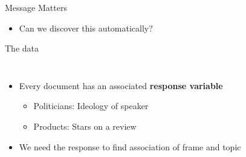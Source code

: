 \documentclass[xcolor=dvipsnames]{beamer}
\begin{document}
{\begin{frame}{Message Matters}
\begin{itemize}
\begin{columns}
\end{columns}
\pause
  \item Can we discover this automatically?
\end{itemize}




\end{frame}


\begin{frame}{The data}
  \begin{columns}
    \begin{itemize}
      \item Every document has an associated {\bf response variable}
        \begin{itemize}
      \item Politicians: \alert<1>{Ideology of speaker}
      \item Products: \alert<2>{Stars on a review}
       \end{itemize}
      \item We need the response to find association of frame and topic
    \end{itemize}


\end{columns}
\end{frame}}
\end{document}

